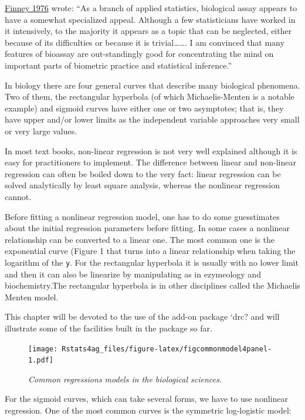 \documentclass[letterpaper,]{book}
\begin{document}
\href{\%22http://www.jstor.org/stable/1403201?origin=crossref\&seq=1\#page_scan_tab_contents\%22}{Finney 1976} wrote: ``As a branch of applied statistics, biological assay appears to have a somewhat specialized appeal. Although a few statisticians have worked in it intensively, to the majority it appears as a topic that can be neglected, either because of its difficulties or because it is trivial\ldots{}\ldots{}. I am convinced that many features of bioassay are out-standingly good for concentrating the mind on important parts of biometric practice and statistical inference.''

In biology there are four general curves that describe many biological phenomena. Two of them, the rectangular hyperbola (of which Michaelis-Menten is a notable example) and sigmoid curves have either one or two asymptotes; that is, they have upper and/or lower limits as the independent variable approaches very small or very large values.

In most text books, non-linear regression is not very well explained although it is easy for practitioners to implement. The difference between linear and non-linear regression can often be boiled down to the very fact: linear regression can be solved analytically by least square analysis, whereas the nonlinear regression cannot.

Before fitting a nonlinear regression model, one has to do some guesstimates about the initial regression parameters before fitting. In some cases a nonlinear relationship can be converted to a linear one. The most common one is the exponential curve (Figure 1 that turns into a linear relationship when taking the logarithm of the \texttt{y}. For the rectangular hyperbola it is usually with no lower limit and then it can also be linearize by manipulating as in ezymeology and biochemistry.The rectangular hyperbola is in other disciplines called the Michaelis Menten model.

This chapter will be devoted to the use of the add-on package `drc? and will illustrate some of the facilities built in the package so far.



\begin{figure}
\centering
\texttt{[image: Rstats4ag\_files/figure-latex/figcommonmodel4panel-1.pdf]}
\caption{\label{fig:figcommonmodel4panel}\emph{Common regressions models in the biological sciences.}}
\end{figure}

For the sigmoid curves, which can take several forms, we have to use nonlinear regression. One of the most common curves is the symmetric log-logistic model:
\end{document}
